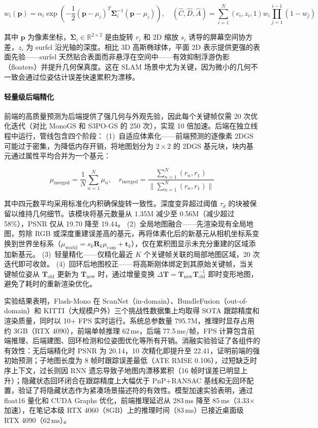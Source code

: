 \begin{equation}
w_i(\mathbf{p}) = \alpha_i \exp\left(-\frac{1}{2}(\mathbf{p}-\mu_i)^T\boldsymbol{\Sigma}_i^{-1}(\mathbf{p}-\mu_i)\right), \quad (\hat{C}, \hat{D}, \hat{A}) = \sum_{i=1}^{N}(c_i, z_i, 1)w_i \prod_{j=1}^{i-1}(1-w_j)
\end{equation}

其中 $\mathbf{p}$ 为像素坐标，$\boldsymbol{\Sigma}_i \in \mathbb{R}^{2 \times 2}$ 是由旋转 $r_i$ 和 2D 缩放 $s_i$ 诱导的屏幕空间协方差，$z_i$ 为 surfel 沿光轴的深度。相比 3D 高斯椭球体，平面 2D 表示提供更强的表面先验——surfel 天然贴合表面而非悬浮在空间中——有效抑制浮游伪影（floaters）并提升几何保真度。这在 SLAM 场景中尤为关键，因为微小的几何不一致会通过位姿估计误差快速累积为漂移。

\paragraph{轻量级后端精化}
前端的高质量预测为后端提供了强几何与外观先验，因此每个关键帧仅需 20 次优化迭代（对比 MonoGS 和 S3PO-GS 的 250 次），实现 10 倍加速。后端在独立线程中运行，管线包含四个阶段：
(1)~自适应体素化——前端预测的逐像素 2DGS 可能过于密集，为降低内存开销，将地图划分为 $2 \times 2$ 的 2DGS 基元块，块内基元通过属性平均合并为一个基元：

\begin{equation}
\mu_{\mathrm{merged}} = \frac{1}{N}\sum_{n=1}^{N}\mu_n, \quad r_{\mathrm{merged}} = \frac{\sum_{n=1}^{N}(r_n, r_1)}{\|\sum_{n=1}^{N}(r_n, r_1)\|}
\end{equation}

其中四元数平均采用标准化内积确保旋转一致性。深度变异超过阈值 $\tau_d$ 的块被保留以维持几何细节。该模块将基元数量从 1.35M 减少至 0.56M（减少超过 58\%），PSNR 仅从 19.70 降至 19.44。
(2)~全局地图融合——先渲染现有全局地图，剪除 RGB 或深度重建误差高的基元，再将体素化后的新基元从相机坐标系变换到世界坐标系（$\mu_{\mathrm{world}} = s_k\mathbf{R}_k\mu_{\mathrm{cam}} + \mathbf{t}_k$），仅在累积图显示未充分重建的区域添加新基元。
(3)~轻量精化——仅精化最近 $K$ 个关键帧关联的局部地图区域，20 次迭代即可收敛。
(4)~回环后地图校正——将高斯刚体绑定到其原始关键帧，当关键帧位姿从 $\mathbf{T}_{\mathrm{old}}$ 更新为 $\mathbf{T}_{\mathrm{new}}$ 时，通过增量变换 $\Delta \mathbf{T} = \mathbf{T}_{\mathrm{new}}\mathbf{T}_{\mathrm{old}}^{-1}$ 即时变形地图，避免了耗时的重新渲染优化。

实验结果表明，Flash-Mono 在 ScanNet（in-domain）、BundleFusion（out-of-domain）和 KITTI（大规模户外）三个挑战性数据集上均取得 SOTA 跟踪精度和渲染质量，同时以 10+ FPS 实时运行。系统总参数量 795.7M，推理时显存占用约 3GB（RTX 4090），前端单帧推理 62\,ms，后端 77.5\,ms/帧，FPS 计算包含前端推理、后端建图、回环检测和位姿图优化等所有开销。消融实验验证了各组件的有效性：无后端精化时 PSNR 为 20.14，10 次精化即提升至 22.41，证明前端的强初始预测；子地图长度为 8 帧时跟踪误差最低（ATE RMSE 0.106），过短缺乏时序上下文，过长则因 RNN 遗忘导致子地图内漂移累积（16 帧时误差已明显上升）；隐藏状态回环闭合在跟踪精度上大幅优于 PnP+RANSAC 基线和无回环配置，验证了将隐藏状态作为紧凑场景描述符的有效性。模型加速实验表明，通过 float16 量化和 CUDA Graphs 优化，前端推理延迟从 283\,ms 降至 85\,ms（3.33$\times$ 加速），在笔记本级 RTX 4060（8GB）上的推理时间（83\,ms）已接近桌面级 RTX 4090（62\,ms）。

